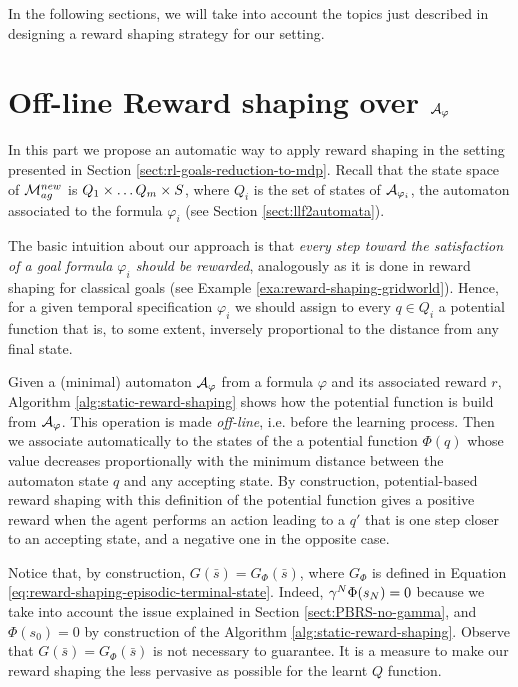 \medskip
In the following sections, we will take into account the topics just described in designing a reward shaping strategy for our setting.

\section{Off-line Reward shaping over $\mathcal{A}_\varphi$}\label{sect:off-line-reward-shaping}
In this part we propose an automatic way to apply reward shaping in the setting presented in Section \ref{sect:rl-goals-reduction-to-mdp}.
Recall that the state space of $\mathcal{M}_{ag}^{new}$ is $Q_1\times \dots Q_m \times S$, where $Q_i$ is the set of states of $\mathcal{A}_{\varphi_i}$, the automaton associated to the \LLf formula $\varphi_i$ (see Section \ref{sect:llf2automata}).

The basic intuition about our approach is that \emph{every step toward the satisfaction of a goal formula $\varphi_i$ should be rewarded}, analogously as it is done in reward shaping for classical goals (see Example \ref{exa:reward-shaping-gridworld}). Hence, for a given temporal specification $\varphi_i$ we should assign to every $q\in Q_i$ a potential function that is, to some extent, inversely proportional to the distance from any final state.

Given a (minimal) automaton $\mathcal{A}_{\varphi}$ from a \LLf formula $\varphi$ and its associated reward $r$, Algorithm \ref{alg:static-reward-shaping} shows how the potential function is build from $\mathcal{A}_{\varphi}$. This operation is made \emph{off-line}, i.e. before the learning process. Then we associate automatically to the states of the \DFA a potential function $\Phi(q)$ whose value decreases proportionally with the minimum distance between the automaton state $q$ and any accepting state. By construction, potential-based reward shaping with this definition of the potential function gives a positive reward when the agent performs an action leading to a $q'$ that is one step closer to an accepting state, and a negative one in the opposite case.
 
Notice that, by construction, $G(\bar{s}) = G_\Phi(\bar{s})$, where $G_\Phi$ is defined in Equation \ref{eq:reward-shaping-episodic-terminal-state}. Indeed, $\gamma^N\Phi(s_N) = 0$ because we take into account the issue explained in Section \ref{sect:PBRS-no-gamma}, and $\Phi(s_0) = 0$ by construction of the Algorithm \ref{alg:static-reward-shaping}. Observe that $G(\bar{s}) = G_\Phi(\bar{s})$ is not necessary to guarantee. It is a measure to make our reward shaping the less pervasive as possible for the learnt $Q$ function.

